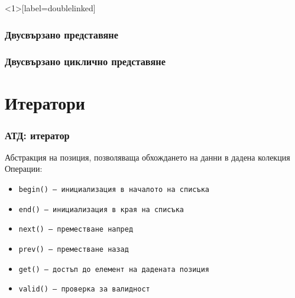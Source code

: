 \documentclass[alsotrans,beameroptions={aspectratio=169}]{beamerswitch}
\newcommand{\doublelinkedchain}{
  \triplecell{a1}{a_1}
  \nexttriplecell{a2}{a_2}{a1}
  \triplenextdots{a2}
  \dotsnexttriplecell{an}{a_n}
}
\begin{document}
\begin{frame}<1>[label=doublelinked]
  \frametitle{Двусвързано представяне}

  \begin{center}
  \end{center}
\end{frame}

\begin{frame}
  \frametitle{Двусвързано циклично представяне}

  \begin{center}
  \end{center}
\end{frame}

\section{Итератори}

\begin{frame}
  \frametitle{АТД: итератор}

  Абстракция на позиция, позволяваща обхождането на данни в дадена колекция\\[2ex]
  Операции:\\[1ex]
  \begin{itemize}
  \item \tt{begin()} -- инициализация в началото на списъка
  \item \tt{end()} -- инициализация в края на списъка
  \item \tt{next()} -- преместване напред
  \item \tt{prev()} -- преместване назад
  \item \tt{get()} -- достъп до елемент на дадената позиция
  \item \tt{valid()} -- проверка за валидност
  \end{itemize}
\end{frame}
\end{document}
